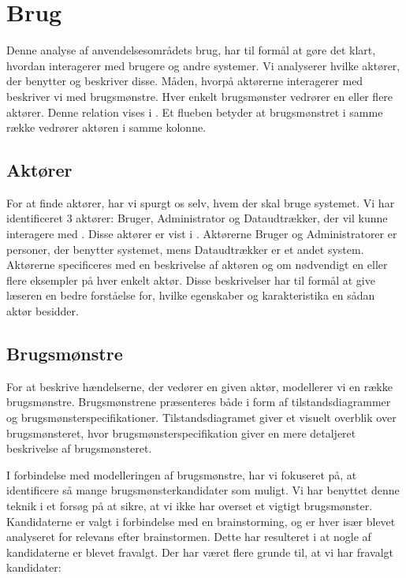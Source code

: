 \section{Brug}
\label{sec:brug}
Denne analyse af anvendelsesområdets brug, har til formål at gøre det klart, hvordan \Foodl{} interagerer med brugere og andre systemer. Vi analyserer hvilke aktører, der benytter \Foodl{} og beskriver disse. Måden, hvorpå aktørerne interagerer med \Foodl{} beskriver vi med brugsmønstre. Hver enkelt brugsmønster vedrører en eller flere aktører. Denne relation vises i . Et flueben betyder at brugsmønstret i samme række vedrører aktøren i samme kolonne.



\subsection{Aktører}
\label{sec:aktoerer}
For at finde aktører, har vi spurgt os selv, hvem der skal bruge systemet. Vi har identificeret 3 aktører: Bruger, Administrator og Dataudtrækker, der vil kunne interagere med \Foodl{}.  Disse aktører er vist i . Aktørerne Bruger og Administratorer er personer, der benytter systemet, mens Dataudtrækker er et andet system. Aktørerne specificeres med en beskrivelse af aktøren og om nødvendigt en eller flere eksempler på hver enkelt aktør. Disse beskrivelser har til formål at give læseren en bedre forståelse for, hvilke egenskaber og karakteristika en sådan aktør besidder. 



\subsection{Brugsmønstre}
\label{subsec:brugsmoenstre}
For at beskrive hændelserne, der vedører en given aktør, modellerer vi en række brugsmønstre. Brugsmønstrene præsenteres både i form af  tilstandsdiagrammer og brugsmønsterspecifikationer. Tilstandsdiagramet giver et visuelt overblik over brugsmønsteret, hvor brugsmønsterspecifikation giver en mere detaljeret beskrivelse af brugsmønsteret.

I forbindelse med modelleringen af brugsmønstre, har vi fokuseret på, at identificere så mange brugsmønsterkandidater som muligt. Vi har benyttet denne teknik i et forsøg på at sikre, at vi ikke har overset et vigtigt brugsmønster. Kandidaterne er valgt i forbindelse med en brainstorming, og er hver især blevet analyseret for relevans efter brainstormen. Dette har resulteret i at nogle af kandidaterne er blevet fravalgt. Der har været flere grunde til, at vi har fravalgt kandidater:

